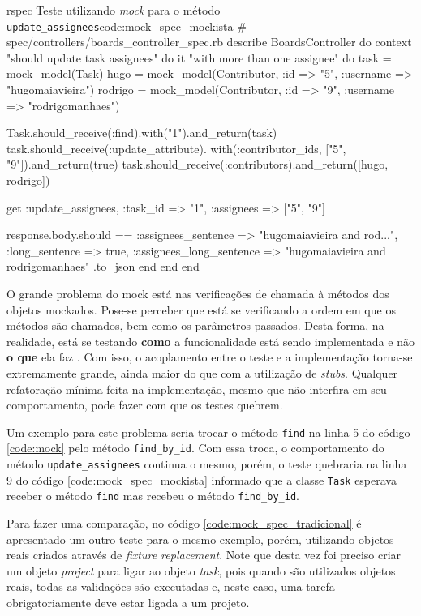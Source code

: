 \begin{mycode}{rspec}%
{Teste utilizando \textit{mock} para o método \texttt{update\_assignees}}{code:mock_spec_mockista}
# spec/controllers/boards_controller_spec.rb
describe BoardsController do
  context "should update task assignees" do
    it "with more than one assignee" do
      task = mock_model(Task)
      hugo = mock_model(Contributor, :id => "5", :username => "hugomaiavieira")
      rodrigo = mock_model(Contributor, :id => "9", :username => "rodrigomanhaes")

      Task.should_receive(:find).with("1").and_return(task)
      task.should_receive(:update_attribute).
        with(:contributor_ids, ["5", "9"]).and_return(true)
      task.should_receive(:contributors).and_return([hugo, rodrigo])

      get :update_assignees, :task_id => "1", :assignees => ["5", "9"]

      response.body.should ==
        { :assignees_sentence => "hugomaiavieira and rod...",
          :long_sentence => true,
          :assignees_long_sentence => "hugomaiavieira and rodrigomanhaes" }.to_json
    end
  end
end
\end{mycode}

O grande problema do mock está nas verificações de chamada à métodos dos objetos mockados. Pose-se perceber que está se verificando a ordem em que os métodos são chamados, bem como os parâmetros passados. Desta forma, na realidade, está se testando \textbf{como} a funcionalidade está sendo implementada e não \textbf{o que} ela faz \cite{UnitForAReason}. Com isso, o acoplamento entre o teste e a implementação torna-se extremamente grande, ainda maior do que com a utilização de \textit{stubs}. Qualquer refatoração mínima feita na implementação, mesmo que não interfira em seu comportamento, pode fazer com que os testes quebrem.

Um exemplo para este problema seria trocar o método \texttt{find} na linha 5 do código \ref{code:mock} pelo método \texttt{find\_by\_id}. Com essa troca, o comportamento do método \texttt{update\_assignees} continua o mesmo, porém, o teste quebraria na linha 9 do código \ref{code:mock_spec_mockista} informado que a classe \texttt{Task} esperava receber o método \texttt{find} mas recebeu o método \texttt{find\_by\_id}.

Para fazer uma comparação, no código \ref{code:mock_spec_tradicional} é apresentado um outro teste para o mesmo exemplo, porém, utilizando objetos reais criados através de \textit{fixture replacement}. Note que desta vez foi preciso criar um objeto \textit{project} para ligar ao objeto \textit{task}, pois quando são utilizados objetos reais, todas as validações são executadas e, neste caso, uma tarefa obrigatoriamente deve estar ligada a um projeto.

